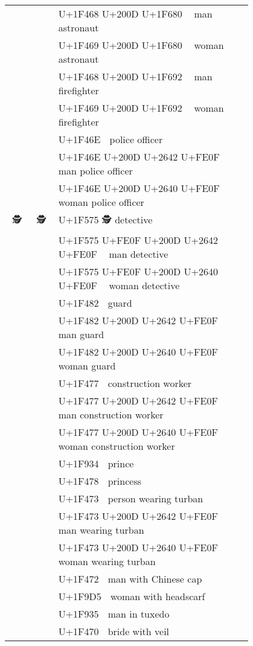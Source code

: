 \documentclass[a4paper,12pt]{ltjarticle}
\newcommand{\fontA}[1]{{\fontspec[RawFeature={mode=harf,+dist,+ccmp}]{Segoe UI Emoji} #1}}
\newcommand{\fontB}[1]{{\fontspec[RawFeature={mode=harf,+dist,+ccmp}]{Noto Color Emoji} #1}}
\begin{document}
\begin{longtable}[c]{ccp{0.8\linewidth}}
\fontA{👨‍🚀}&\fontB{👨‍🚀}&U+1F468 U+200D U+1F680 👨‍🚀 man astronaut\\
\fontA{👩‍🚀}&\fontB{👩‍🚀}&U+1F469 U+200D U+1F680 👩‍🚀 woman astronaut\\
\fontA{👨‍🚒}&\fontB{👨‍🚒}&U+1F468 U+200D U+1F692 👨‍🚒 man firefighter\\
\fontA{👩‍🚒}&\fontB{👩‍🚒}&U+1F469 U+200D U+1F692 👩‍🚒 woman firefighter\\
\fontA{👮}&\fontB{👮}&U+1F46E 👮 police officer\\
\fontA{👮‍♂️}&\fontB{👮‍♂️}&U+1F46E U+200D U+2642 U+FE0F 👮‍♂️ man police officer\\
\fontA{👮‍♀️}&\fontB{👮‍♀️}&U+1F46E U+200D U+2640 U+FE0F 👮‍♀️ woman police officer\\
\fontA{🕵}&\fontB{🕵}&U+1F575 🕵 detective\\
\fontA{🕵️‍♂️}&\fontB{🕵️‍♂️}&U+1F575 U+FE0F U+200D U+2642 U+FE0F 🕵️‍♂️ man detective\\
\fontA{🕵️‍♀️}&\fontB{🕵️‍♀️}&U+1F575 U+FE0F U+200D U+2640 U+FE0F 🕵️‍♀️ woman detective\\
\fontA{💂}&\fontB{💂}&U+1F482 💂 guard\\
\fontA{💂‍♂️}&\fontB{💂‍♂️}&U+1F482 U+200D U+2642 U+FE0F 💂‍♂️ man guard\\
\fontA{💂‍♀️}&\fontB{💂‍♀️}&U+1F482 U+200D U+2640 U+FE0F 💂‍♀️ woman guard\\
\fontA{👷}&\fontB{👷}&U+1F477 👷 construction worker\\
\fontA{👷‍♂️}&\fontB{👷‍♂️}&U+1F477 U+200D U+2642 U+FE0F 👷‍♂️ man construction worker\\
\fontA{👷‍♀️}&\fontB{👷‍♀️}&U+1F477 U+200D U+2640 U+FE0F 👷‍♀️ woman construction worker\\
\fontA{🤴}&\fontB{🤴}&U+1F934 🤴 prince\\
\fontA{👸}&\fontB{👸}&U+1F478 👸 princess\\
\fontA{👳}&\fontB{👳}&U+1F473 👳 person wearing turban\\
\fontA{👳‍♂️}&\fontB{👳‍♂️}&U+1F473 U+200D U+2642 U+FE0F 👳‍♂️ man wearing turban\\
\fontA{👳‍♀️}&\fontB{👳‍♀️}&U+1F473 U+200D U+2640 U+FE0F 👳‍♀️ woman wearing turban\\
\fontA{👲}&\fontB{👲}&U+1F472 👲 man with Chinese cap\\
\fontA{🧕}&\fontB{🧕}&U+1F9D5 🧕 woman with headscarf\\
\fontA{🤵}&\fontB{🤵}&U+1F935 🤵 man in tuxedo\\
\fontA{👰}&\fontB{👰}&U+1F470 👰 bride with veil\\

\end{longtable}
\end{document}
